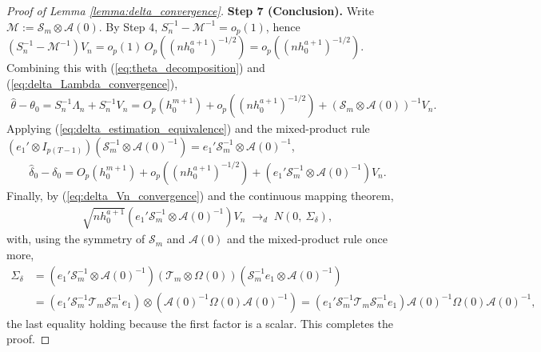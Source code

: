 \documentclass{article}
\begin{document}
\begin{appendices}
\begin{proof}[Proof of Lemma \ref{lemma:delta_convergence}]
    \textbf{Step 7 (Conclusion).}
    Write $\mathcal{M}:=\mathcal{S}_m\otimes\mathcal{A}(0)$. By Step 4,
    $S_n^{-1}-\mathcal{M}^{-1}=o_p(1)$, hence
    $\left(S_n^{-1}-\mathcal{M}^{-1}\right)V_n = o_p(1)\,O_p\!\left((nh_0^{a+1})^{-1/2}\right)
    = o_p\!\left((nh_0^{a+1})^{-1/2}\right)$. Combining this with
    (\ref{eq:theta_decomposition}) and (\ref{eq:delta_Lambda_convergence}),
    \begin{align*}
        \hat{\theta}-\theta_0
        = S_n^{-1}\Lambda_n + S_n^{-1}V_n
        = O_p\!\left(h_0^{m+1}\right) + o_p\!\left((nh_0^{a+1})^{-1/2}\right)
        + \left(\mathcal{S}_m\otimes \mathcal{A}(0)\right)^{-1} V_n .
    \end{align*}
    Applying (\ref{eq:delta_estimation_equivalence}) and the mixed-product rule
    $\left(e_1'\otimes I_{p(T-1)}\right)\left(\mathcal{S}_m^{-1}\otimes\mathcal{A}(0)^{-1}\right)
    = e_1'\mathcal{S}_m^{-1}\otimes\mathcal{A}(0)^{-1}$,
    \begin{align*}
        \hat{\delta}_0-\delta_0
        = O_p\!\left(h_0^{m+1}\right) + o_p\!\left((nh_0^{a+1})^{-1/2}\right)
        + \left(e_1'\mathcal{S}_m^{-1}\otimes \mathcal{A}(0)^{-1}\right) V_n .
    \end{align*}
    Finally, by (\ref{eq:delta_Vn_convergence}) and the continuous mapping theorem,
    \begin{align*}
        \sqrt{nh_0^{a+1}}\left(e_1'\mathcal{S}_m^{-1}\otimes \mathcal{A}(0)^{-1}\right) V_n
        \;\to_d\; N\!\left(0,\ \Sigma_\delta\right),
    \end{align*}
    with, using the symmetry of $\mathcal{S}_m$ and $\mathcal{A}(0)$ and the
    mixed-product rule once more,
    \begin{align*}
        \Sigma_\delta
        &= \left(e_1'\mathcal{S}_m^{-1}\otimes \mathcal{A}(0)^{-1}\right)
        \left(\mathcal{T}_m\otimes \Omega(0)\right)
        \left(\mathcal{S}_m^{-1}e_1\otimes \mathcal{A}(0)^{-1}\right)\\
        &= \left(e_1'\mathcal{S}_m^{-1}\mathcal{T}_m\mathcal{S}_m^{-1}e_1\right)
        \otimes\left(\mathcal{A}(0)^{-1}\Omega(0)\mathcal{A}(0)^{-1}\right)
        = \left(e_1'\mathcal{S}_m^{-1}\mathcal{T}_m\mathcal{S}_m^{-1}e_1\right)
        \mathcal{A}(0)^{-1}\Omega(0)\mathcal{A}(0)^{-1},
    \end{align*}
    the last equality holding because the first factor is a scalar. This completes
    the proof.




\end{proof}
\end{appendices}
\end{document}
